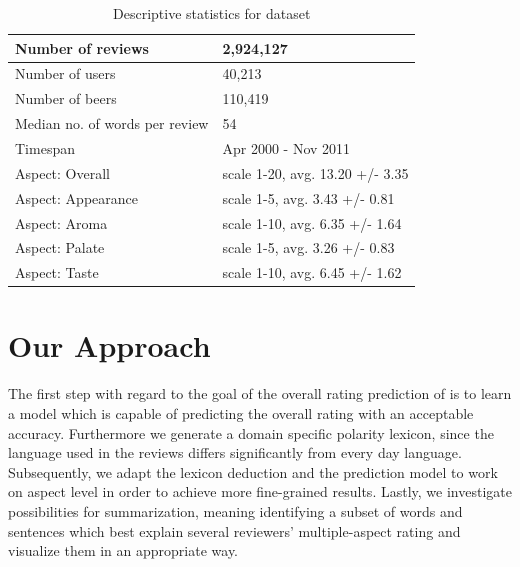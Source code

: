 \documentclass[11pt,titlepage,oneside,openany]{book}
\begin{document}
\begin{table}[h]
\label{tab:statistics}
\begin{center}

\begin{tabular}{|l|l|}
\hline
Number of reviews                  & 2,924,127           \\ \hline
Number of users                    & 40,213              \\ \hline
Number of beers                    & 110,419             \\ \hline
Median no. of words per review     & 54                  \\ \hline
Timespan                           & Apr 2000 - Nov 2011 \\ \hline
Aspect: Overall                    & scale 1-20, avg. 13.20 +/- 3.35 \\ \hline
Aspect: Appearance                 & scale 1-5,  avg. 3.43 +/- 0.81 \\ \hline
Aspect: Aroma                      & scale 1-10, avg. 6.35 +/- 1.64 \\ \hline
Aspect: Palate                     & scale 1-5,  avg. 3.26 +/- 0.83 \\ \hline
Aspect: Taste                      & scale 1-10, avg. 6.45 +/- 1.62 \\ \hline

\end{tabular}
\caption{Descriptive statistics for dataset}
\end{center}

\end{table}









\chapter{Our Approach}

The first step with regard to the goal of the overall rating prediction of is to learn a model which is capable of predicting the overall rating with an acceptable accuracy. Furthermore we generate a domain specific polarity lexicon, since the language used in the reviews differs significantly from every day language. Subsequently, we adapt the lexicon deduction and the prediction model to work on aspect level in order to achieve more fine-grained results. Lastly, we investigate possibilities for summarization, meaning identifying a subset of words and sentences which best explain several reviewers' multiple-aspect rating and visualize them in an appropriate way.
\end{document}
